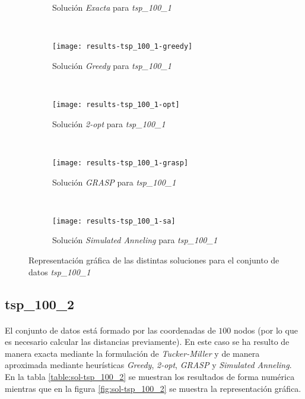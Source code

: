 \documentclass[spanish]{article}
\begin{document}
			\begin{figure}[h]
				\centering
				\begin{subfigure}{.4\textwidth}
					\centering
					\caption{Solución \emph{Exacta} para \emph{tsp\_100\_1}}
				\end{subfigure} \
				\begin{subfigure}{.4\textwidth}
					\centering
					\texttt{[image: results-tsp\_100\_1-greedy]}
					\caption{Solución \emph{Greedy} para \emph{tsp\_100\_1}}
				\end{subfigure} \\
				\begin{subfigure}{.4\textwidth}
					\centering
					\texttt{[image: results-tsp\_100\_1-opt]}
					\caption{Solución \emph{2-opt} para \emph{tsp\_100\_1}}
				\end{subfigure} \
				\begin{subfigure}{.4\textwidth}
					\centering
					\texttt{[image: results-tsp\_100\_1-grasp]}
					\caption{Solución \emph{GRASP} para \emph{tsp\_100\_1}}
				\end{subfigure} \\
				\begin{subfigure}{.4\textwidth}
					\centering
					\texttt{[image: results-tsp\_100\_1-sa]}
					\caption{Solución \emph{Simulated Anneling} para \emph{tsp\_100\_1}}
				\end{subfigure}
				\caption{Representación gráfica de las distintas soluciones para el conjunto de datos \emph{tsp\_100\_1}}
				\label{fig:sol-tsp_100_1}
			\end{figure}

		\subsection{tsp\_100\_2}

			\paragraph{}
			El conjunto de datos está formado por las coordenadas de $100$ nodos (por lo que es necesario calcular las distancias previamente). En este caso se ha resulto de manera exacta mediante la formulación de \emph{Tucker-Miller} y de manera aproximada mediante heurísticas \emph{Greedy}, \emph{2-opt}, \emph{GRASP} y \emph{Simulated Anneling}. En la tabla \ref{table:sol-tsp_100_2} se muestran los resultados de forma numérica mientras que en la figura \ref{fig:sol-tsp_100_2} se muestra la representación gráfica.
\end{document}
